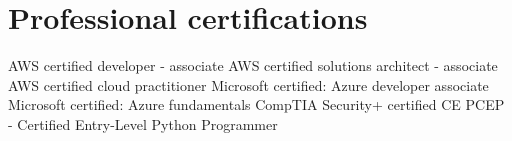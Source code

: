 \section{Professional certifications}
{%
}
{%
	AWS certified developer - associate}
{}
{%
}
{%
	AWS certified solutions architect - associate}
{}
{%
}
{%
	AWS certified cloud practitioner}
{}
{%
}
{%
	Microsoft certified: Azure developer associate}
{}
{%
}
{%
	Microsoft certified: Azure fundamentals}
{}
{%
}
{%
	CompTIA Security+ certified CE}
{}
{%
}
{%
	PCEP - Certified Entry-Level Python Programmer}
{}
